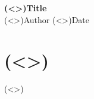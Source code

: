\documentclass[11pt]{article} %
\begin{document}
\begin{center}
\Large\textbf{(<>)Title}\\
\vspace{11pt}
\large{(<>)Author}
\hfill \large{(<>)Date}
\end{center}

\section{(<>)}

{(<>)}

\clearpage



\end{document}
